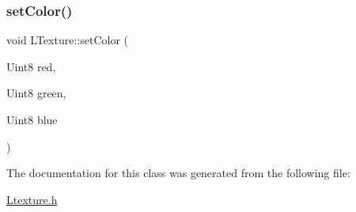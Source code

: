 \subsubsection{\texorpdfstring{set\+Color()}{setColor()}}
{\footnotesize\ttfamily void L\+Texture\+::set\+Color (\begin{DoxyParamCaption}\item[{Uint8}]{red,  }\item[{Uint8}]{green,  }\item[{Uint8}]{blue }\end{DoxyParamCaption})}



The documentation for this class was generated from the following file\+:\begin{DoxyCompactItemize}
\item 
\hyperlink{_ltexture_8h}{Ltexture.\+h}\end{DoxyCompactItemize}

